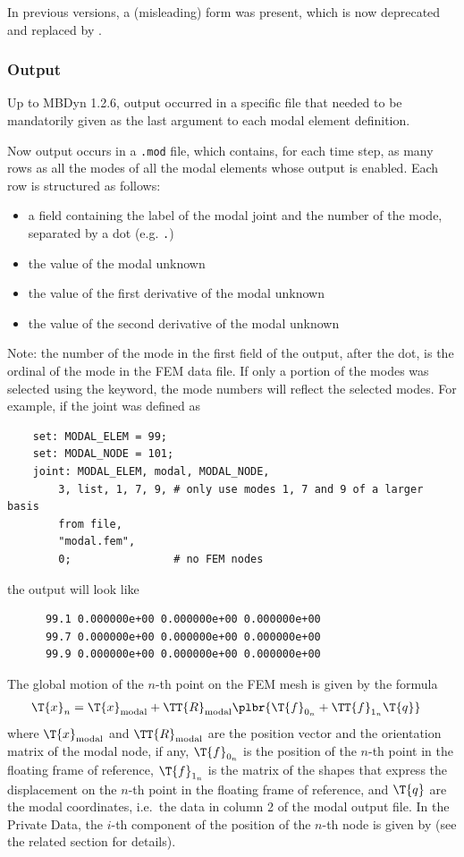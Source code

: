 In previous versions, a (misleading)  form
was present, which is now deprecated and replaced by .



\subsubsection{Output}
Up to MBDyn 1.2.6, output occurred in a specific file that needed
to be mandatorily given as the last argument to each modal element
definition.

Now output occurs in a \texttt{.mod} file, which contains, for each time step,
as many rows as all the modes of all the modal elements whose output is enabled.
Each row is structured as follows:
\begin{itemize}
\item a field containing the label of the modal joint and the number of the mode,
separated by a dot (e.g. \texttt{.})
\item the value of the modal unknown
\item the value of the first derivative of the modal unknown
\item the value of the second derivative of the modal unknown
\end{itemize}
Note: the number of the mode in the first field of the output, after the dot,
is the ordinal of the mode in the FEM data file.
If only a portion of the modes was selected using the  keyword,
the mode numbers will reflect the selected modes.
For example, if the  joint was defined as
\begin{verbatim}
    set: MODAL_ELEM = 99;
    set: MODAL_NODE = 101;
    joint: MODAL_ELEM, modal, MODAL_NODE,
        3, list, 1, 7, 9, # only use modes 1, 7 and 9 of a larger basis
        from file,
        "modal.fem",
        0;                # no FEM nodes
\end{verbatim}
the output will look like
\begin{verbatim}
      99.1 0.000000e+00 0.000000e+00 0.000000e+00
      99.7 0.000000e+00 0.000000e+00 0.000000e+00
      99.9 0.000000e+00 0.000000e+00 0.000000e+00
\end{verbatim}
The global motion of the $n$-th point on the FEM mesh is given by the formula
\begin{align}
	\T{x}_n
	&=
	\T{x}_\text{modal}
	+
	\TT{R}_\text{modal} \plbr{
		\T{f}_{0_n}
		+
		\TT{f}_{1_n} \T{q}
	}
\end{align}
where $\T{x}_\text{modal}$ and $\TT{R}_\text{modal}$
are the position vector and the orientation matrix of the modal node, if any,
$\T{f}_{0_n}$ is the position of the $n$-th point in the floating frame of reference,
$\T{f}_{1_n}$ is the matrix of the shapes that express the displacement on the $n$-th point
in the floating frame of reference, and $\T{q}$ are the modal coordinates,
i.e.\ the data in column 2 of the modal output file.
In the Private Data, the $i$-th component of the position of the $n$-th node
is given by  (see the related section for details).



